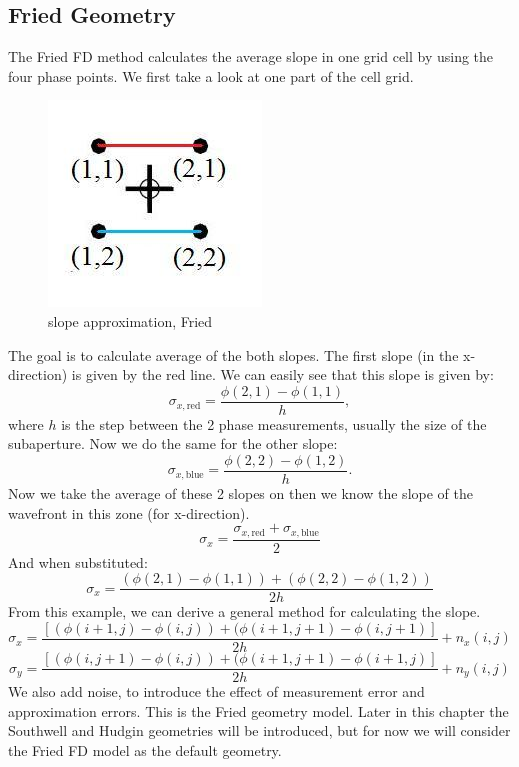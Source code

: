 \documentclass{article}
\begin{document}
\subsection{Fried Geometry}
The Fried FD method calculates the average slope in one grid cell by using the four phase points. We first take a look at one part of the cell grid.
\begin{figure}[h!]
  \centering
  \includegraphics[scale=0.6]{figures/fried}
  \caption{slope approximation, Fried}
\end{figure}
\newpage
\noindent The goal is to calculate average of the both slopes. The first slope (in the x-direction) is given by the red line. We can easily see that this slope is given by:
$$ \sigma_{x,\text{red}} = \frac{\phi(2,1) - \phi(1,1)}{h}, $$
where $h$ is the step between the 2 phase measurements, usually the size of the subaperture.
Now we do the same for the other slope:
$$ \sigma_{x,\text{blue}} = \frac{\phi(2,2) - \phi(1,2)}{h}. $$
Now we take the average of these 2 slopes on then we know the slope of the wavefront in this zone (for x-direction).
$$ \sigma_x = \frac{\sigma_{x,\text{red}}+\sigma_{x,\text{blue}}}{2}$$
And when substituted:
$$ \sigma_x = \frac{(\phi(2,1) - \phi(1,1))+(\phi(2,2) - \phi(1,2))}{2h}$$
From this example, we can derive a general method for calculating the slope. 
$$ \sigma_x = \frac{[(\phi(i+1,j)-\phi(i,j))+(\phi(i+1,j+1)-\phi(i,j+1)]}{2h} + n_x(i,j)$$
$$ \sigma_y = \frac{[(\phi(i,j+1)-\phi(i,j))+(\phi(i+1,j+1)-\phi(i+1,j)]}{2h} + n_y(i,j)$$
We also add noise, to introduce the effect of measurement error and approximation errors.
This is the Fried geometry model. Later in this chapter the Southwell and Hudgin geometries will be introduced, but for now we will consider the Fried FD model as the default geometry.
\end{document}
